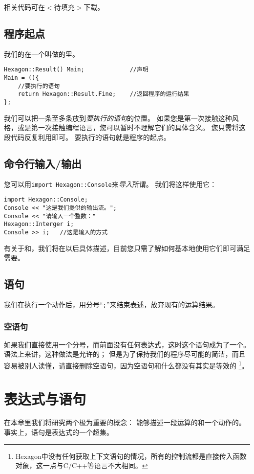 \documentclass[a4paper]{tufte-book}
\begin{document}
		相关代码可在$<$待填充$>$下载。
		
		\section{程序起点}
			我们的在一个叫做的里。
			\begin{lstlisting}[caption={main函数的标准形式}]
Hexagon::Result() Main; 			//声明
Main = (){
	//要执行的语句
	return Hexagon::Result.Fine;	//返回程序的运行结果
};
			\end{lstlisting}
			我们可以把一条至多条放到\emph{要执行的语句}的位置。
			如果您是第一次接触这种风格，或是第一次接触编程语言，您可以暂时不理解它们的具体含义。
			您只需将这段代码反复利用即可。
			要执行的语句就是程序的起点。
			
		\section{命令行输入/输出}
			您可以用\verb|import Hexagon::Console|来\emph{导入}所谓。
			我们将这样使用它：
			\begin{lstlisting}[caption={输入/输出流}]
import Hexagon::Console;
Console << "这是我们提供的输出流。";
Console << "请输入一个整数："
Hexagon::Interger i;
Console >> i; 	//这是输入的方式
			\end{lstlisting}
			有关于和，我们将在以后具体描述，目前您只需了解如何基本地使用它们即可满足需要。
			
		\section{语句}
			我们在执行一个动作后，用分号“\verb|;|”来结束表述，放弃现有的运算结果。
			\subsection{空语句}
				如果我们直接使用一个分号，而前面没有任何表达式，这时这个语句成为了一个。
				语法上来讲，这种做法是允许的；
				但是为了保持我们的程序尽可能的简洁，而且容易被别人读懂，请直接删除空语句，因为空语句和什么都没有其实是等效的
				\footnote{Hexagon中没有任何获取上下文语句的情况，所有的控制流都是直接传入函数对象，这一点与C/C++等语言不大相同。}。
	\chapter{表达式与语句}
		在本章里我们将研究两个极为重要的概念：
		能够描述一段运算的和一个动作的。
		事实上，语句是表达式的一个超集。
\end{document}

